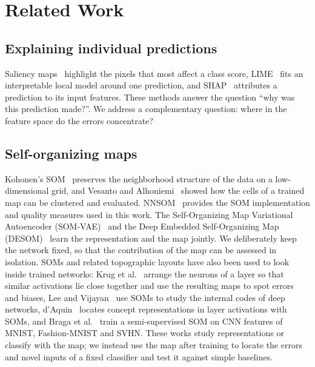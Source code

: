 \documentclass[preprint,review,12pt]{elsarticle}
\begin{document}
\FloatBarrier
\section{Related Work}\label{sec:related}

\subsection{Explaining individual predictions}
Saliency maps~\cite{simonyan2014saliency} highlight the pixels that most affect a class score, LIME~\cite{ribeiro2016lime} fits an interpretable local model around one prediction, and SHAP~\cite{lundberg2017shap} attributes a prediction to its input features. These methods answer the question ``why was this prediction made?''. We address a complementary question: where in the feature space do the errors concentrate?

\subsection{Self-organizing maps}
Kohonen's SOM~\cite{kohonen1990som} preserves the neighborhood structure of the data on a low-dimensional grid, and Vesanto and Alhoniemi~\cite{vesanto2000clustering} showed how the cells of a trained map can be clustered and evaluated. NNSOM~\cite{jafari_nnsom} provides the SOM implementation and quality measures used in this work. The Self-Organizing Map Variational Autoencoder (SOM-VAE)~\cite{fortuin2019somvae} and the Deep Embedded Self-Organizing Map (DESOM)~\cite{forest2021desom} learn the representation and the map jointly. We deliberately keep the network fixed, so that the contribution of the map can be assessed in isolation. SOMs and related topographic layouts have also been used to look inside trained networks: Krug et al.~\cite{krug2023topographic} arrange the neurons of a layer so that similar activations lie close together and use the resulting maps to spot errors and biases, Lee and Vijayan~\cite{lee2022generalization} use SOMs to study the internal codes of deep networks, d'Aquin~\cite{daquin2023concept} locates concept representations in layer activations with SOMs, and Braga et al.~\cite{braga2020batchsssom} train a semi-supervised SOM on CNN features of MNIST, Fashion-MNIST and SVHN. These works study representations or classify with the map; we instead use the map after training to locate the errors and novel inputs of a fixed classifier and test it against simple baselines.
\end{document}
